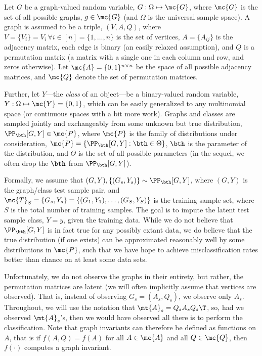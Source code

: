 
Let $G$ be a graph-valued random variable, $G: \Omega \mapsto \mc{G}$, where $\mc{G}$ is the set of all possible graphs, $g \in \mc{G}$ (and $\Omega$ is the universal sample space). A graph is assumed to be a triple, $(V,A,Q)$, where $V=\{V_i\}=V_i \, \forall i \in [n]=\{1,\ldots,n\}$ is the set of vertices, $A=\{A_{ij}\}$ is the adjacency matrix, each edge is binary (an easily relaxed assumption), and $Q$ is a permutation matrix (a matrix with a single one in each column and row, and zeros otherwise). Let $\mc{A}=\{0,1\}^{n \times n}$ be the space of all possible adjacency matrices, and $\mc{Q}$ denote the set of permutation matrices.

Further, let $Y$---the \emph{class} of an object---be a binary-valued random variable, $Y: \Omega \mapsto \mc{Y} = \{0,1\}$, which can be easily generalized to any multinomial space (or continuous spaces with a bit more work).  Graphs and classes are sampled jointly and exchangeably from some unknown but true distribution, $\PP_{\bth}[G,Y] \in \mc{P}$, where $\mc{P}$ is the family of distributions under consideration, $\mc{P} = \{\PP_{\bth}[G,Y] : \bth \in \Theta\}$, $\bth$ is the parameter of the distribution, and $\Theta$ is the set of all possible parameters (in the sequel, we often drop the $\bth$ from $\PP_{\bth}[G,Y]$).  

Formally, we assume that  $(G,Y), \{(G_s,Y_s)\} \sim \PP_{\bth}[G,Y]$, where $(G,Y)$ is the graph/class test sample pair, and $\mc{T}_S=\{G_s,Y_s\}=\{(G_1,Y_1),\ldots, (G_S,Y_S)\}$ is the training sample set, where $S$ is the total number of training samples.  The goal is to impute the latent test sample class, $Y=y$, given the training data.  While we do not believe that $\PP_{\bth}[G,Y]$ is in fact true for any possibly extant data, we do believe that the true distribution (if one exists) can be approximated reasonably well by some distributions in $\mc{P}$, such that we have hope to achieve misclassification rates better than chance on at least some data sets.  

Unfortunately, we do not observe the graphs in their entirety, but rather, the permutation matrices are latent (we will often implicitly assume that vertices are observed).  That is, instead of observing $G_s=(A_s,Q_s)$, we observe only $A_s$.  Throughout, we will use the notation that $\mt{A}_s = Q_s A_s Q_s\T$, so, had we observed $\mt{A}_s$'s, then we would have observed all there is to perform the classification.  Note that graph invariants can therefore be defined as functions on $A$, that is if $f(A,Q)=f(A)$ for all $A\in \mc{A}$ and all $Q \in \mc{Q}$, then $f(\cdot)$ computes a graph invariant.


